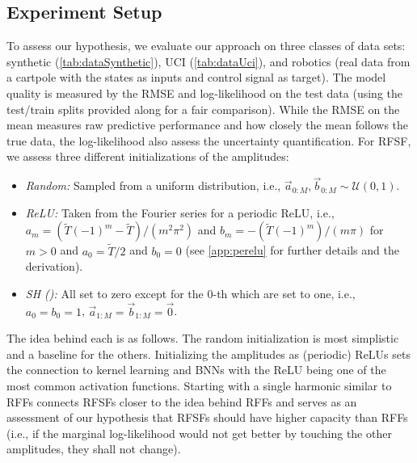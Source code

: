\subsection{Experiment Setup}  \label{subsec:setup}
	To assess our hypothesis, we evaluate our approach on three classes of data sets: synthetic (\cref{tab:dataSynthetic}), \ac{UCI}\cite{duaUCIMachineLearning2017} (\cref{tab:dataUci}), and robotics (real data from a cartpole with the states as inputs and control signal as target).
	The model quality is measured by the \ac{RMSE} and log-likelihood on the test data (using the test/train splits provided along\cite{galDropoutBayesianApproximation2016} for a fair comparison).
	While the \ac{RMSE} on the mean measures raw predictive performance and how closely the mean follows the true data, the log-likelihood also assess the uncertainty quantification.
	For \ac{RFSF}, we assess three different initializations of the amplitudes:
	\begin{itemize}
		\item \emph{Random:}               Sampled from a uniform distribution, i.e., $\vec{a}_{0:M}, \vec{b}_{0:M} \sim \mathcal{U}(0, 1)$.
		\item \emph{\ac{ReLU}:}            Taken from the Fourier series for a periodic \ac{ReLU}, i.e., $a_m = (\tilde{T} (-1)^m - \tilde{T}) / (m^2 \pi^2)$ and $b_m = -(\tilde{T} (-1)^m) / (m \pi)$ for $m > 0$ and $a_0 = \tilde{T}/2$ and $b_0 = 0$ (see \cref{app:perelu} for further details and the derivation).
		\item \emph{\acl{SH} ():} All set to zero except for the $0$-th which are set to one, i.e., $a_0 = b_0 = 1$, $\vec{a}_{1:M} = \vec{b}_{1:M} = \vec{0}$.
	\end{itemize}
	The idea behind each is as follows.
	The random initialization is most simplistic and a baseline for the others.
	Initializing the amplitudes as (periodic) \acp{ReLU} sets the connection to kernel learning and \acp{BNN} with the \ac{ReLU} being one of the most common activation functions.
	Starting with a single harmonic similar to \acp{RFF} connects \acp{RFSF} closer to the idea behind \acp{RFF} and serves as an assessment of our hypothesis that \acp{RFSF} should have higher capacity than \acp{RFF} (i.e., if the marginal log-likelihood would not get better by touching the other amplitudes, they shall not change).

